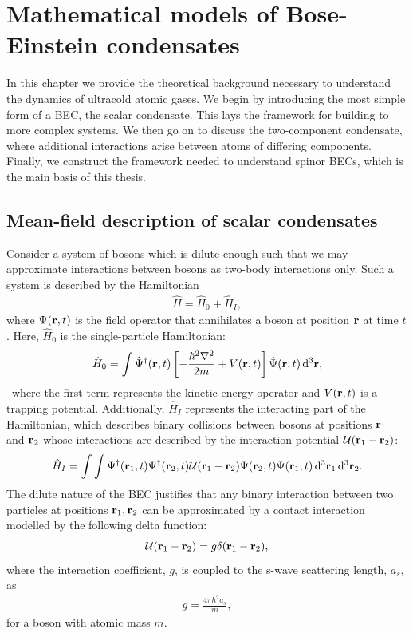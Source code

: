 \chapter{Mathematical models of Bose-Einstein condensates}\label{chap: theory}

In this chapter we provide the theoretical background necessary to understand
the dynamics of ultracold atomic gases.
We begin by introducing the most simple form of a BEC, the scalar condensate.
This lays the framework for building to more complex systems.
We then go on to discuss the two-component condensate, where additional
interactions arise between atoms of differing components.
Finally, we construct the framework needed to understand spinor BECs, which is
the main basis of this thesis.

\section{Mean-field description of scalar condensates}
Consider a system of bosons which is dilute enough such that we may approximate
interactions between bosons as two-body interactions only.
Such a system is described by the Hamiltonian~\cite{Pethick2008}
\begin{align}\label{eq: scalar-hamiltonian}
    \hat{H} = \hat{H}_0 + \hat{H}_I,
\end{align}
where \(\Psi(\vb{r}, t)\) is the field operator that annihilates a boson at
position \(\vb{r}\) at time \(t\).
Here, \(\hat{H}_0\) is the single-particle Hamiltonian:
\begin{align}
    \hat{H}_0 = \int \hat{\Psi}^\dagger(\vb{r}, t)\left[
        -\frac{\hbar^2\nabla^2}{2m} + V(\vb{r}, t)
    \right]\hat{\Psi}(\vb{r}, t)\, \dd^3\vb{r},
\end{align}\
where the first term represents the kinetic energy operator and \(V(\vb{r}, t)\)
is a trapping potential.
Additionally, \(\hat{H}_I\) represents the interacting part of the Hamiltonian,
which describes binary collisions between bosons at positions \(\vb{r}_1\) and
\(\vb{r}_2\) whose interactions are described by the interaction potential
\(\mathcal{U}(\vb{r}_1 - \vb{r}_2)\):
\begin{align}
    \hat{H}_I = \int \int \Psi^\dagger(\vb{r}_1, t)\Psi^\dagger(\vb{r}_2, t)
    \mathcal{U}(\vb{r}_1 - \vb{r}_2)\Psi(\vb{r}_2, t)\Psi(\vb{r}_1, t)
    \, \dd^3\vb{r}_1 \, \dd^3\vb{r}_2.
\end{align}
The dilute nature of the BEC justifies that any binary interaction
between two particles at positions \(\vb{r}_1, \vb{r}_2\) can be approximated by
a contact interaction modelled by the following delta function:
\begin{equation}
    \mathcal{U}(\vb{r}_1 - \vb{r}_2) = g\delta(\vb{r}_1 - \vb{r}_2),
\end{equation}
where the interaction coefficient, \(g\), is coupled to the s-wave scattering
length, \(a_s\), as
\begin{align}
    g = \frac{4\pi\hbar^2a_s}{m},
\end{align}
for a boson with atomic mass \(m\).

